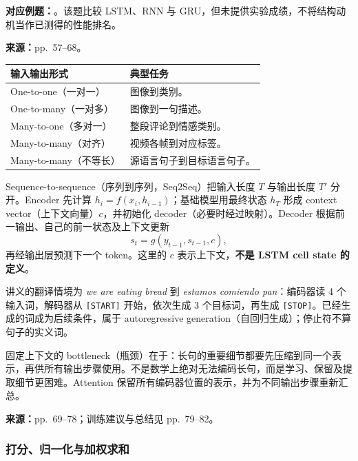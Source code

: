\textbf{对应例题：}。该题比较 LSTM、RNN 与 GRU，但未提供实验成绩，不将结构动机当作已测得的性能排名。


\textbf{来源：}pp.~57--68。

\begin{center}
\small
\begin{tabularx}{\textwidth}{@{}lX@{}}
\toprule
输入输出形式 & 典型任务 \\
\midrule
One-to-one（一对一） & 图像到类别。 \\
One-to-many（一对多） & 图像到一句描述。 \\
Many-to-one（多对一） & 整段评论到情感类别。 \\
Many-to-many（对齐） & 视频各帧到对应标签。 \\
Many-to-many（不等长） & 源语言句子到目标语言句子。 \\
\bottomrule
\end{tabularx}
\end{center}

Sequence-to-sequence（序列到序列，Seq2Seq）把输入长度 $T$ 与输出长度 $T'$ 分开。Encoder 先计算 $h_i=f(x_i,h_{i-1})$；基础模型用最终状态 $h_T$ 形成 context vector（上下文向量）$c$，并初始化 decoder（必要时经过映射）。Decoder 根据前一输出、自己的前一状态及上下文更新
\[
 s_t=g(y_{t-1},s_{t-1},c),
\]
再经输出层预测下一个 token。这里的 $c$ 表示上下文，\textbf{不是 LSTM cell state 的定义}。

讲义的翻译情境为 \emph{we are eating bread} 到 \emph{estamos comiendo pan}：编码器读 4 个输入词，解码器从 \texttt{[START]} 开始，依次生成 3 个目标词，再生成 \texttt{[STOP]}。已经生成的词成为后续条件，属于 autoregressive generation（自回归生成）；停止符不算句子的实义词。

固定上下文的 bottleneck（瓶颈）在于：长句的重要细节都要先压缩到同一个表示，再供所有输出步骤使用。不是数学上绝对无法编码长句，而是学习、保留及提取细节更困难。Attention 保留所有编码器位置的表示，并为不同输出步骤重新汇总。


\textbf{来源：}pp.~69--78；训练建议与总结见 pp.~79--82。

\subsubsection{打分、归一化与加权求和}

